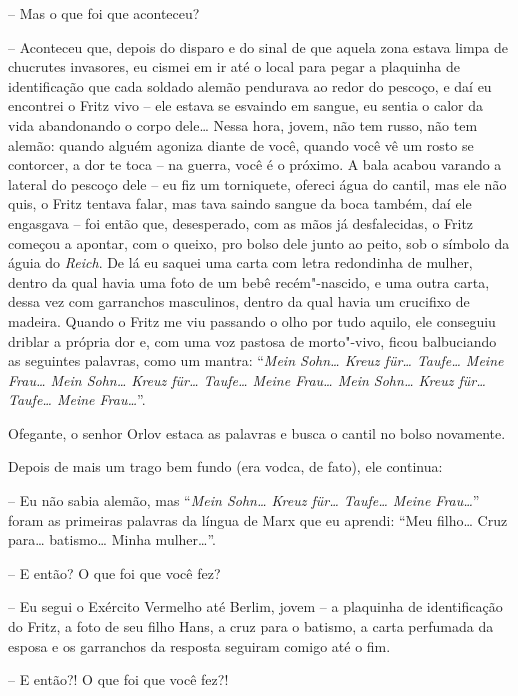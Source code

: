 -- Mas o que foi que aconteceu?

-- Aconteceu que, depois do disparo e do sinal de que aquela zona estava
limpa de chucrutes invasores, eu cismei em ir até o local para pegar a
plaquinha de identificação que cada soldado alemão pendurava ao redor do
pescoço, e daí eu encontrei o Fritz vivo -- ele estava se esvaindo em
sangue, eu sentia o calor da vida abandonando o corpo dele\ldots{} Nessa
hora, jovem, não tem russo, não tem alemão: quando alguém agoniza diante
de você, quando você vê um rosto se contorcer, a dor te toca -- na
guerra, você é o próximo. A bala acabou varando a lateral do pescoço
dele -- eu fiz um torniquete, ofereci água do cantil, mas ele não quis,
o Fritz tentava falar, mas tava saindo sangue da boca também, daí ele
engasgava -- foi então que, desesperado, com as mãos já desfalecidas, o
Fritz começou a apontar, com o queixo, pro bolso dele junto ao peito,
sob o símbolo da águia do \emph{Reich}. De lá eu saquei uma carta com
letra redondinha de mulher, dentro da qual havia uma foto de um bebê
recém"-nascido, e uma outra carta, dessa vez com garranchos masculinos,
dentro da qual havia um crucifixo de madeira. Quando o Fritz me viu
passando o olho por tudo aquilo, ele conseguiu driblar a própria dor e,
com uma voz pastosa de morto"-vivo, ficou balbuciando as seguintes
palavras, como um mantra: ``\emph{Mein Sohn\ldots{} Kreuz für\ldots{} Taufe\ldots{}
Meine Frau\ldots{} Mein Sohn\ldots{} Kreuz für\ldots{} Taufe\ldots{} Meine Frau\ldots{} Mein
Sohn\ldots{} Kreuz für\ldots{} Taufe\ldots{} Meine Frau\ldots{}}''.

Ofegante, o senhor Orlov estaca as palavras e busca o cantil no bolso
novamente.

Depois de mais um trago bem fundo (era vodca, de fato), ele continua:

-- Eu não sabia alemão, mas ``\emph{Mein Sohn\ldots{} Kreuz für\ldots{} Taufe\ldots{}
Meine Frau\ldots{}}'' foram as primeiras palavras da língua de Marx que eu
aprendi: ``Meu filho\ldots{} Cruz para\ldots{} batismo\ldots{} Minha mulher\ldots{}''.

-- E então? O que foi que você fez?

-- Eu segui o Exército Vermelho até Berlim, jovem -- a plaquinha de
identificação do Fritz, a foto de seu filho Hans, a cruz para o batismo,
a carta perfumada da esposa e os garranchos da resposta seguiram comigo
até o fim.

-- E então?! O que foi que você fez?!

